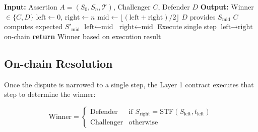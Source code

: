 \begin{algorithm}
\caption{Interactive Fraud Proof Protocol}
\begin{algorithmic}[1]
\State \textbf{Input:} Assertion $A = (S_0, S_n, \mathcal{T})$, Challenger $C$, Defender $D$
\State \textbf{Output:} Winner $\in \{C, D\}$
\State $\text{left} \gets 0$, $\text{right} \gets n$
    \State $\text{mid} \gets \lfloor(\text{left} + \text{right})/2\rfloor$
    \State $D$ provides $S_{\text{mid}}$
    \State $C$ computes expected $S'_{\text{mid}}$
        \State $\text{left} \gets \text{mid}$ 
    \Else
        \State $\text{right} \gets \text{mid}$ 
    \EndIf
\EndWhile
\State Execute single step $\text{left} \rightarrow \text{right}$ on-chain
\State \textbf{return} Winner based on execution result
\end{algorithmic}
\end{algorithm}

\subsection{On-chain Resolution}

Once the dispute is narrowed to a single step, the Layer 1 contract executes that step to determine the winner:

\begin{equation}
\text{Winner} = \begin{cases}
\text{Defender} & \text{if } S_{\text{right}} = \text{STF}(S_{\text{left}}, t_{\text{left}}) \\
\text{Challenger} & \text{otherwise}
\end{cases}
\end{equation}

